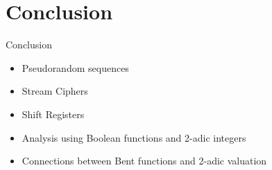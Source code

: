 \documentclass{beamer}
\begin{document}
\section{Conclusion}
\begin{frame}{Conclusion}
  \begin{itemize}
    \item Pseudorandom sequences
    \item Stream Ciphers
    \item Shift Registers
    \item Analysis using Boolean functions and 2-adic integers
    \item Connections between Bent functions and 2-adic valuation
  \end{itemize}
\end{frame}
\end{document}
